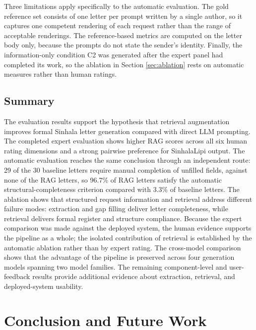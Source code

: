 \documentclass[12pt]{uomthesis}
\begin{document}
Three limitations apply specifically to the automatic evaluation. The gold reference set consists of one letter per prompt written by a single author, so it captures one competent rendering of each request rather than the range of acceptable renderings. The reference-based metrics are computed on the letter body only, because the prompts do not state the sender's identity. Finally, the information-only condition C2 was generated after the expert panel had completed its work, so the ablation in Section \ref{sec:ablation} rests on automatic measures rather than human ratings.

\section{Summary}

The evaluation results support the hypothesis that retrieval augmentation improves formal Sinhala letter generation compared with direct LLM prompting. The completed expert evaluation shows higher RAG scores across all six human rating dimensions and a strong pairwise preference for SinhalaLipi output. The automatic evaluation reaches the same conclusion through an independent route: 29 of the 30 baseline letters require manual completion of unfilled fields, against none of the RAG letters, so 96.7\% of RAG letters satisfy the automatic structural-completeness criterion compared with 3.3\% of baseline letters. The ablation shows that structured request information and retrieval address different failure modes: extraction and gap filling deliver letter completeness, while retrieval delivers formal register and structure compliance. Because the expert comparison was made against the deployed system, the human evidence supports the pipeline as a whole; the isolated contribution of retrieval is established by the automatic ablation rather than by expert rating. The cross-model comparison shows that the advantage of the pipeline is preserved across four generation models spanning two model families. The remaining component-level and user-feedback results provide additional evidence about extraction, retrieval, and deployed-system usability.

\chapter{Conclusion and Future Work}
\end{document}
